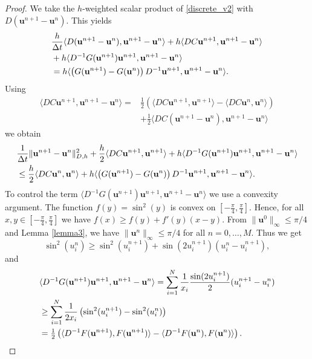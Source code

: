 \documentclass{siamltex}
\newcommand{\bu}{\mathbf u}
\begin{document}
{\begin{lemma}
\end{lemma}
\begin{proof} 
	We take the $h$-weighted scalar product of \eqref{discrete_v2} with $D(\bu^{n+1}-\bu^n)$. This yields
	\[  \begin{split}
	& \frac{h}{\Delta t} \langle D(\bu^{n+1}-\bu^n),\bu^{n+1}-\bu^n \rangle + h \langle DC \bu^{n+1},\bu^{n+1}-\bu^{n} \rangle \notag \\
		& + h \langle D^{-1} G(\bu^{n+1})\bu^{n+1},\bu^{n+1}-\bu^n \rangle \notag \\ & = h
		 \langle \left( G(\bu^{n+1})-G(\bu^{n})\right) D^{-1}\bu^{n+1}, \bu^{n+1}-\bu^{n} \rangle. 
		 \end{split}
	\]
Using 
	\begin{align*}
		\langle DC \bu^{n+1},\bu^{n+1}-\bu^{n} \rangle = &\tfrac{1}{2}\left(\langle DC \bu^{n+1},\bu^{n+1} \rangle - \langle DC \bu^{n},\bu^{n}\rangle \right) \\
		&+\tfrac{1}{2}  \langle DC (\bu^{n+1}-\bu^n),\bu^{n+1}-\bu^n  \rangle
	\end{align*}
we obtain
  \begin{align} 
	& \frac{1}{\Delta t} \|\bu^{n+1}-\bu^n\|_{D,h}^2+ \frac{h}{2} \langle DC \bu^{n+1},\bu^{n+1} \rangle \notag 
		 + h \langle D^{-1} G(\bu^{n+1})\bu^{n+1},\bu^{n+1}-\bu^n \rangle \notag  \notag \\ & \leq \frac{h}{2}\langle DC \bu^{n},\bu^{n} \rangle +
		 h\langle \left( G(\bu^{n+1})-G(\bu^{n})\right) D^{-1}\bu^{n+1},\bu^{n+1}-\bu^{n} \rangle. 
		 \label{ee} \end{align}
		 To control the term $\langle D^{-1} G(\bu^{n+1})\bu^{n+1},\bu^{n+1}-\bu^n \rangle$ we use a convexity argument. 
		 The function $f(y)=\sin^2(y)$ is convex on $[-\frac{\pi}{4}, \frac{\pi}{4}]$. Hence, for all $x,y \in [-\frac{\pi}{4}, \frac{\pi}{4}]$ we have $f(x) \geq f(y) + f'(y)(x-y)$. 
	 From $\| \bu^0 \|_\infty \leq \pi/4$ and  Lemma \ref{lemma3}, we have $\| \bu^{n} \|_\infty \leq \pi/4$ for all $n=0,\hdots,M$. Thus we get 
	\[
		\sin^2 (u^{n}_i) \geq \sin^2 (u^{n+1}_i) + \sin(2u_i^{n+1})\left(u_i^n-u_i^{n+1} \right),
	\]
	and
	\begin{align*}
		& \langle D^{-1} G(\bu^{n+1})\bu^{n+1},\bu^{n+1}-\bu^n \rangle =  \sum_{i=1}^N \frac{1}{x_i} \frac{\sin(2u_i^{n+1})}{2}(u_i^{n+1}-u_i^n) \\
		&\geq \sum_{i=1}^N \frac{1}{2x_i}\left(\sin^2(u_i^{n+1})-\sin^2(u_i^{n})\right) \notag \\
		&=\tfrac{1}{2}\left(\langle D^{-1} F(\bu^{n+1}),F(\bu^{n+1})\rangle - \langle D^{-1} F(\bu^{n}),F(\bu^{n})\rangle \right).

\end{align*}
\end{proof}}
\end{document}
